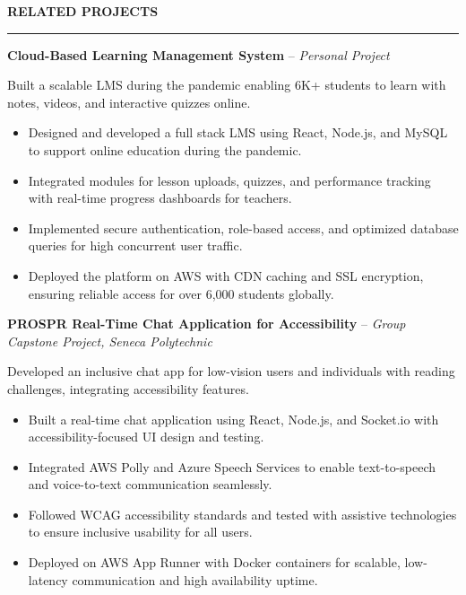 \documentclass[10pt,letterpaper]{article}
\begin{document}
\vspace{6pt}

\textbf{RELATED PROJECTS}\\[-8pt]
\noindent\rule{\textwidth}{1pt}

\vspace{-2pt}

\textbf{Cloud-Based Learning Management System} -- \emph{Personal Project}

\vspace{-1pt}

Built a scalable LMS during the pandemic enabling 6K+ students to learn with notes, videos, and interactive quizzes online.
\vspace{-1pt}
\begin{itemize}
\item Designed and developed a full stack LMS using React, Node.js, and MySQL to support online education during the pandemic.
\item Integrated modules for lesson uploads, quizzes, and performance tracking with real-time progress dashboards for teachers.
\item Implemented secure authentication, role-based access, and optimized database queries for high concurrent user traffic.
\item Deployed the platform on AWS with CDN caching and SSL encryption, ensuring reliable access for over 6,000 students globally.
\end{itemize}

\textbf{PROSPR  Real-Time Chat Application for Accessibility} -- \emph{Group Capstone Project, Seneca Polytechnic}

\vspace{-1pt}

Developed an inclusive chat app for low-vision users and individuals with reading challenges, integrating accessibility features.
\vspace{-1pt}
\begin{itemize}
\item Built a real-time chat application using React, Node.js, and Socket.io with accessibility-focused UI design and testing.
\item Integrated AWS Polly and Azure Speech Services to enable text-to-speech and voice-to-text communication seamlessly.
\item Followed WCAG accessibility standards and tested with assistive technologies to ensure inclusive usability for all users.
\item Deployed on AWS App Runner with Docker containers for scalable, low-latency communication and high availability uptime.
\end{itemize}
\end{document}

